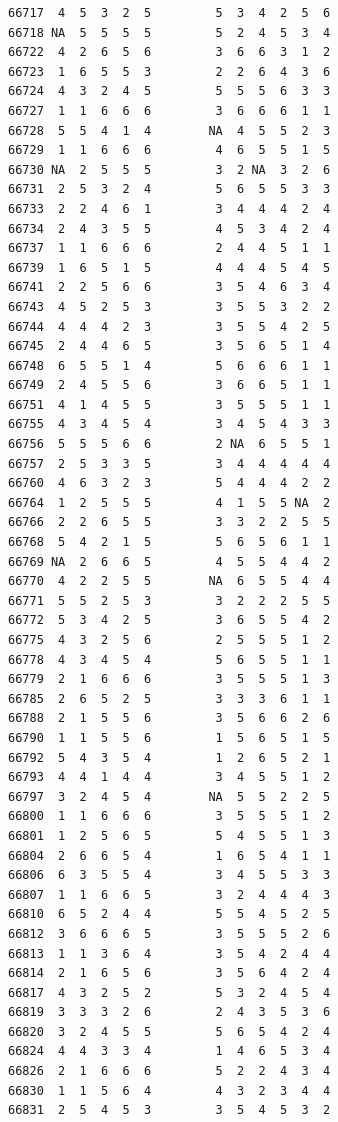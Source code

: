 \documentclass[
  letterpaper,
  DIV=11,
  numbers=noendperiod]{scrreprt}
\begin{document}
\begin{verbatim}
66717  4  5  3  2  5         5  3  4  2  5  6
66718 NA  5  5  5  5         5  2  4  5  3  4
66722  4  2  6  5  6         3  6  6  3  1  2
66723  1  6  5  5  3         2  2  6  4  3  6
66724  4  3  2  4  5         5  5  5  6  3  3
66727  1  1  6  6  6         3  6  6  6  1  1
66728  5  5  4  1  4        NA  4  5  5  2  3
66729  1  1  6  6  6         4  6  5  5  1  5
66730 NA  2  5  5  5         3  2 NA  3  2  6
66731  2  5  3  2  4         5  6  5  5  3  3
66733  2  2  4  6  1         3  4  4  4  2  4
66734  2  4  3  5  5         4  5  3  4  2  4
66737  1  1  6  6  6         2  4  4  5  1  1
66739  1  6  5  1  5         4  4  4  5  4  5
66741  2  2  5  6  6         3  5  4  6  3  4
66743  4  5  2  5  3         3  5  5  3  2  2
66744  4  4  4  2  3         3  5  5  4  2  5
66745  2  4  4  6  5         3  5  6  5  1  4
66748  6  5  5  1  4         5  6  6  6  1  1
66749  2  4  5  5  6         3  6  6  5  1  1
66751  4  1  4  5  5         3  5  5  5  1  1
66755  4  3  4  5  4         3  4  5  4  3  3
66756  5  5  5  6  6         2 NA  6  5  5  1
66757  2  5  3  3  5         3  4  4  4  4  4
66760  4  6  3  2  3         5  4  4  4  2  2
66764  1  2  5  5  5         4  1  5  5 NA  2
66766  2  2  6  5  5         3  3  2  2  5  5
66768  5  4  2  1  5         5  6  5  6  1  1
66769 NA  2  6  6  5         4  5  5  4  4  2
66770  4  2  2  5  5        NA  6  5  5  4  4
66771  5  5  2  5  3         3  2  2  2  5  5
66772  5  3  4  2  5         3  6  5  5  4  2
66775  4  3  2  5  6         2  5  5  5  1  2
66778  4  3  4  5  4         5  6  5  5  1  1
66779  2  1  6  6  6         3  5  5  5  1  3
66785  2  6  5  2  5         3  3  3  6  1  1
66788  2  1  5  5  6         3  5  6  6  2  6
66790  1  1  5  5  6         1  5  6  5  1  5
66792  5  4  3  5  4         1  2  6  5  2  1
66793  4  4  1  4  4         3  4  5  5  1  2
66797  3  2  4  5  4        NA  5  5  2  2  5
66800  1  1  6  6  6         3  5  5  5  1  2
66801  1  2  5  6  5         5  4  5  5  1  3
66804  2  6  6  5  4         1  6  5  4  1  1
66806  6  3  5  5  4         3  4  5  5  3  3
66807  1  1  6  6  5         3  2  4  4  4  3
66810  6  5  2  4  4         5  5  4  5  2  5
66812  3  6  6  6  5         3  5  5  5  2  6
66813  1  1  3  6  4         3  5  4  2  4  4
66814  2  1  6  5  6         3  5  6  4  2  4
66817  4  3  2  5  2         5  3  2  4  5  4
66819  3  3  3  2  6         2  4  3  5  3  6
66820  3  2  4  5  5         5  6  5  4  2  4
66824  4  4  3  3  4         1  4  6  5  3  4
66826  2  1  6  6  6         5  2  2  4  3  4
66830  1  1  5  6  4         4  3  2  3  4  4
66831  2  5  4  5  3         3  5  4  5  3  2

\end{verbatim}
\end{document}
